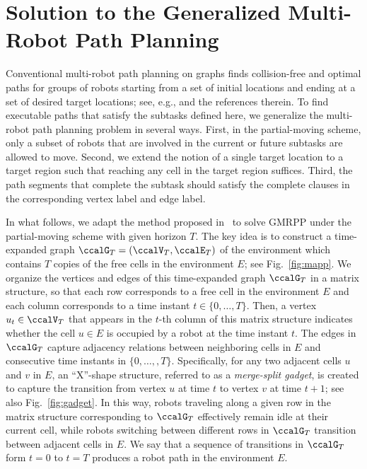 \documentclass[Afour,sageh,times]{sagej}
\newcommand{\auto}[1]{\ccalA_{\textup{#1}}}
\newcommand{\vertex}[1]{v_{\textup{#1}}}
\begin{document}
{{%

\section{Solution to the Generalized Multi-Robot Path Planning}\label{sec:solution2mapp}

{ Conventional multi-robot path planning on graphs finds collision-free and optimal paths for groups of robots starting from a set of initial locations and ending at a set of desired target locations; see, e.g., \cite{yu2016optimal} and the references therein. To find executable paths that satisfy the subtasks defined here, we generalize the multi-robot path planning problem in several ways. First, in the partial-moving scheme,  only a subset of robots that are involved in the current or future subtasks are allowed to move.  Second, we extend the notion of a single target location to a target region such that reaching any cell in the target region suffices. Third, the path segments that complete the  subtask should satisfy the complete clauses in the corresponding vertex label and edge label.


  In what follows, we adapt the method proposed in~\cite{yu2016optimal} to solve GMRPP under the partial-moving scheme with given horizon $T$.  The key idea is to construct a time-expanded graph $\ccalG_T = (\ccalV_T, \ccalE_T)$ of the environment which contains $T$ copies of the free cells in the environment $E$; see Fig.~\ref{fig:mapp}. We organize the vertices and edges of this time-expanded graph $\ccalG_T$ in a matrix structure, so that each row corresponds to a free cell in the environment $E$ and each column corresponds to a time instant $t\in \{0,\ldots,T\}$. Then, a vertex $u_t \in \ccalV_T$ that appears in the $t$-th column of this matrix structure indicates whether the cell $u\in E$ is occupied by a robot at the time instant $t$. The edges in $\ccalG_T$ capture  adjacency relations between neighboring cells in $E$ and consecutive time instants in $\{0,\ldots,,T\}$. Specifically, for any two adjacent cells $u$ and $v$ in $E$, an ``X''-shape structure, referred to as a {\it merge-split gadget}, is created to capture the transition from vertex $u$ at time $t$ to vertex $v$ at time $t+1$; see also Fig.~\ref{fig:gadget}. In this way, robots traveling along a given row in the matrix structure corresponding to $\ccalG_T$ effectively remain idle at their current cell, while robots switching between different rows in $\ccalG_T$ transition between adjacent cells in $E$. We say that a sequence of transitions in $\ccalG_T$ form $t=0$ to $t=T$ produces a robot path in the environment $E$.

}}}
\end{document}
